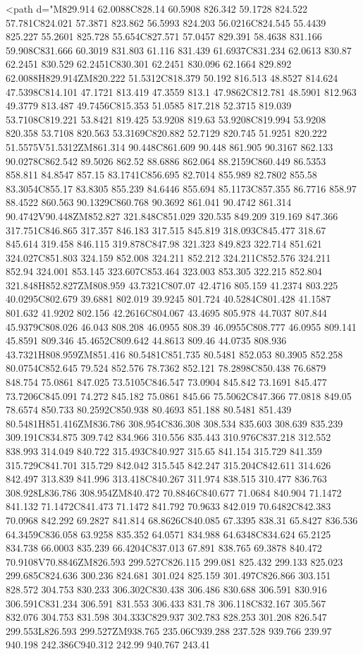 <path d="M829.914 62.0088C828.14 60.5908 826.342 59.1728 824.522 57.781C824.021 57.3871 823.862 56.5993 824.203 56.0216C824.545 55.4439 825.227 55.2601 825.728 55.654C827.571 57.0457 829.391 58.4638 831.166 59.908C831.666 60.3019 831.803 61.116 831.439 61.6937C831.234 62.0613 830.87 62.2451 830.529 62.2451C830.301 62.2451 830.096 62.1664 829.892 62.0088H829.914ZM820.222 51.5312C818.379 50.192 816.513 48.8527 814.624 47.5398C814.101 47.1721 813.419 47.3559 813.1 47.9862C812.781 48.5901 812.963 49.3779 813.487 49.7456C815.353 51.0585 817.218 52.3715 819.039 53.7108C819.221 53.8421 819.425 53.9208 819.63 53.9208C819.994 53.9208 820.358 53.7108 820.563 53.3169C820.882 52.7129 820.745 51.9251 820.222 51.5575V51.5312ZM861.314 90.448C861.609 90.448 861.905 90.3167 862.133 90.0278C862.542 89.5026 862.52 88.6886 862.064 88.2159C860.449 86.5353 858.811 84.8547 857.15 83.1741C856.695 82.7014 855.989 82.7802 855.58 83.3054C855.17 83.8305 855.239 84.6446 855.694 85.1173C857.355 86.7716 858.97 88.4522 860.563 90.1329C860.768 90.3692 861.041 90.4742 861.314 90.4742V90.448ZM852.827 321.848C851.029 320.535 849.209 319.169 847.366 317.751C846.865 317.357 846.183 317.515 845.819 318.093C845.477 318.67 845.614 319.458 846.115 319.878C847.98 321.323 849.823 322.714 851.621 324.027C851.803 324.159 852.008 324.211 852.212 324.211C852.576 324.211 852.94 324.001 853.145 323.607C853.464 323.003 853.305 322.215 852.804 321.848H852.827ZM808.959 43.7321C807.07 42.4716 805.159 41.2374 803.225 40.0295C802.679 39.6881 802.019 39.9245 801.724 40.5284C801.428 41.1587 801.632 41.9202 802.156 42.2616C804.067 43.4695 805.978 44.7037 807.844 45.9379C808.026 46.043 808.208 46.0955 808.39 46.0955C808.777 46.0955 809.141 45.8591 809.346 45.4652C809.642 44.8613 809.46 44.0735 808.936 43.7321H808.959ZM851.416 80.5481C851.735 80.5481 852.053 80.3905 852.258 80.0754C852.645 79.524 852.576 78.7362 852.121 78.2898C850.438 76.6879 848.754 75.0861 847.025 73.5105C846.547 73.0904 845.842 73.1691 845.477 73.7206C845.091 74.272 845.182 75.0861 845.66 75.5062C847.366 77.0818 849.05 78.6574 850.733 80.2592C850.938 80.4693 851.188 80.5481 851.439 80.5481H851.416ZM836.786 308.954C836.308 308.534 835.603 308.639 835.239 309.191C834.875 309.742 834.966 310.556 835.443 310.976C837.218 312.552 838.993 314.049 840.722 315.493C840.927 315.65 841.154 315.729 841.359 315.729C841.701 315.729 842.042 315.545 842.247 315.204C842.611 314.626 842.497 313.839 841.996 313.418C840.267 311.974 838.515 310.477 836.763 308.928L836.786 308.954ZM840.472 70.8846C840.677 71.0684 840.904 71.1472 841.132 71.1472C841.473 71.1472 841.792 70.9633 842.019 70.6482C842.383 70.0968 842.292 69.2827 841.814 68.8626C840.085 67.3395 838.31 65.8427 836.536 64.3459C836.058 63.9258 835.352 64.0571 834.988 64.6348C834.624 65.2125 834.738 66.0003 835.239 66.4204C837.013 67.891 838.765 69.3878 840.472 70.9108V70.8846ZM826.593 299.527C826.115 299.081 825.432 299.133 825.023 299.685C824.636 300.236 824.681 301.024 825.159 301.497C826.866 303.151 828.572 304.753 830.233 306.302C830.438 306.486 830.688 306.591 830.916 306.591C831.234 306.591 831.553 306.433 831.78 306.118C832.167 305.567 832.076 304.753 831.598 304.333C829.937 302.783 828.253 301.208 826.547 299.553L826.593 299.527ZM938.765 235.06C939.288 237.528 939.766 239.97 940.198 242.386C940.312 242.99 940.767 243.41 